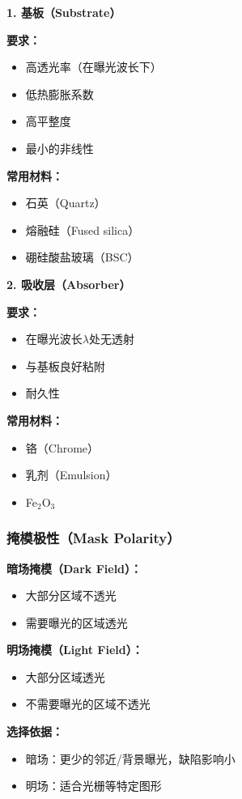 \documentclass[UTF8,12pt,a4paper]{ctexart}
\begin{document}
\textbf{1. 基板（Substrate）}

\textbf{要求：}
\begin{itemize}
    \item 高透光率（在曝光波长下）
    \item 低热膨胀系数
    \item 高平整度
    \item 最小的非线性
\end{itemize}

\textbf{常用材料：}
\begin{itemize}
    \item 石英（Quartz）
    \item 熔融硅（Fused silica）
    \item 硼硅酸盐玻璃（BSC）
\end{itemize}

\textbf{2. 吸收层（Absorber）}

\textbf{要求：}
\begin{itemize}
    \item 在曝光波长$\lambda$处无透射
    \item 与基板良好粘附
    \item 耐久性
\end{itemize}

\textbf{常用材料：}
\begin{itemize}
    \item 铬（Chrome）
    \item 乳剂（Emulsion）
    \item Fe$_2$O$_3$
\end{itemize}

\subsubsection{掩模极性（Mask Polarity）}

\textbf{暗场掩模（Dark Field）：}
\begin{itemize}
    \item 大部分区域不透光
    \item 需要曝光的区域透光
\end{itemize}

\textbf{明场掩模（Light Field）：}
\begin{itemize}
    \item 大部分区域透光
    \item 不需要曝光的区域不透光
\end{itemize}

\textbf{选择依据：}
\begin{itemize}
    \item 暗场：更少的邻近/背景曝光，缺陷影响小
    \item 明场：适合光栅等特定图形
\end{itemize}
\end{document}

